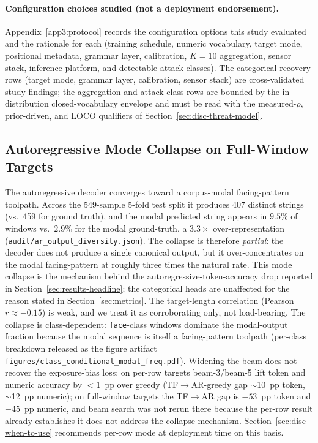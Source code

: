 \documentclass[sensors,article,submit,moreauthors,pdftex]{Definitions/mdpi}
\begin{document}
\paragraph{Configuration choices studied (not a deployment endorsement).} Appendix~\ref{app3:protocol} records the configuration options this study evaluated and the rationale for each (training schedule, numeric vocabulary, target mode, positional metadata, grammar layer, calibration, $K\!=\!10$ aggregation, sensor stack, inference platform, and detectable attack classes). The categorical-recovery rows (target mode, grammar layer, calibration, sensor stack) are cross-validated study findings; the aggregation and attack-class rows are bounded by the in-distribution closed-vocabulary envelope and must be read with the measured-$\rho$, prior-driven, and LOCO qualifiers of Section~\ref{sec:disc-threat-model}.

\subsection{Autoregressive Mode Collapse on Full-Window Targets}
\label{sec:disc-mode-collapse}

The autoregressive decoder converges toward a corpus-modal facing-pattern toolpath. Across the 549-sample 5-fold test split it produces 407 distinct strings (vs.\ 459 for ground truth), and the modal predicted string appears in $9.5\%$ of windows vs.\ $2.9\%$ for the modal ground-truth, a $3.3\times$ over-representation (\texttt{audit/ar\_output\_diversity.json}). The collapse is therefore \emph{partial}: the decoder does not produce a single canonical output, but it over-concentrates on the modal facing-pattern at roughly three times the natural rate. This mode collapse is the mechanism behind the autoregressive-token-accuracy drop reported in Section~\ref{sec:results-headline}; the categorical heads are unaffected for the reason stated in Section~\ref{sec:metrics}. The target-length correlation (Pearson $r \approx -0.15$) is weak, and we treat it as corroborating only, not load-bearing. The collapse is class-dependent: \texttt{face}-class windows dominate the modal-output fraction because the modal sequence is itself a facing-pattern toolpath (per-class breakdown released as the figure artifact \texttt{figures/class\_conditional\_modal\_freq.pdf}). Widening the beam does not recover the exposure-bias loss: on per-row targets beam-3/beam-5 lift token and numeric accuracy by $<\!1$~pp over greedy (TF$\to$AR-greedy gap $\sim$10~pp token, $\sim$12~pp numeric); on full-window targets the TF$\to$AR gap is $-53$~pp token and $-45$~pp numeric, and beam search was not rerun there because the per-row result already establishes it does not address the collapse mechanism. Section~\ref{sec:disc-when-to-use} recommends per-row mode at deployment time on this basis.
\end{document}

